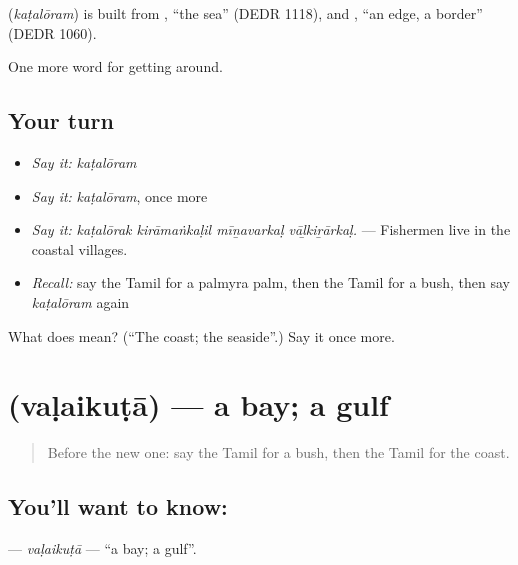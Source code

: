 \begin{cousinweb}
\textbf{} (\emph{kaṭalōram}) is built from , \textquotedblleft{}the sea\textquotedblright{} (DEDR 1118), and , \textquotedblleft{}an edge, a border\textquotedblright{} (DEDR 1060).
\end{cousinweb}

\begin{grammarlens}[title={What you've built}]
One more word for getting around.
\end{grammarlens}

\subsection*{Your turn}
\begin{itemize}
\raggedright
  \item \emph{Say it:} \emph{kaṭalōram}
  \item \emph{Say it:} \emph{kaṭalōram}, once more
  \item \emph{Say it:} \emph{kaṭalōrak kirāmaṅkaḷil mīṉavarkaḷ vāḻkiṟārkaḷ.} — Fishermen live in the coastal villages.
  \item \emph{Recall:} say the Tamil for a palmyra palm, then the Tamil for a bush, then say \emph{kaṭalōram} again
\end{itemize}

\begin{tcolorbox}[breakable,colback=teal!4,colframe=teal!35!black,title={Before you move on}]
What does  mean? (\textquotedblleft{}The coast; the seaside\textquotedblright{}.) Say it once more.
\end{tcolorbox}
\section[\texorpdfstring{\ta{வளைகுடா} (vaḷaikuṭā)}{வளைகுடா (vaḷaikuṭā)}]{ (vaḷaikuṭā) — a bay; a gulf}

\label{lesson:TA-C435-valaikuta}



\begin{quote}
Before the new one: say the Tamil for a bush, then the Tamil for the coast.
\end{quote}

\subsection*{You'll want to know: }
\textbf{} — \emph{vaḷaikuṭā} — \textquotedblleft{}a bay; a gulf\textquotedblright{}.


